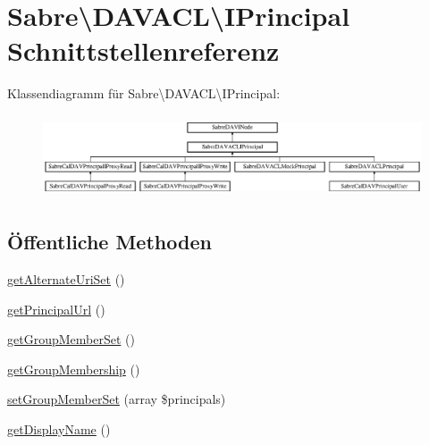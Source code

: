\hypertarget{interface_sabre_1_1_d_a_v_a_c_l_1_1_i_principal}{}\section{Sabre\textbackslash{}D\+A\+V\+A\+CL\textbackslash{}I\+Principal Schnittstellenreferenz}
\label{interface_sabre_1_1_d_a_v_a_c_l_1_1_i_principal}
Klassendiagramm für Sabre\textbackslash{}D\+A\+V\+A\+CL\textbackslash{}I\+Principal\+:\begin{figure}[H]
\begin{center}
\leavevmode
\includegraphics[height=2.466960cm]{interface_sabre_1_1_d_a_v_a_c_l_1_1_i_principal}
\end{center}
\end{figure}
\subsection*{Öffentliche Methoden}
\begin{DoxyCompactItemize}
\item 
\mbox{\hyperlink{interface_sabre_1_1_d_a_v_a_c_l_1_1_i_principal_ac28ebb97541a792d73dd4e15d3b8cdb6}{get\+Alternate\+Uri\+Set}} ()
\item 
\mbox{\hyperlink{interface_sabre_1_1_d_a_v_a_c_l_1_1_i_principal_ae3fc8f13f54eb5daba7416068c685298}{get\+Principal\+Url}} ()
\item 
\mbox{\hyperlink{interface_sabre_1_1_d_a_v_a_c_l_1_1_i_principal_ad9f9e4ed25ec5ec9325288b076cdd09f}{get\+Group\+Member\+Set}} ()
\item 
\mbox{\hyperlink{interface_sabre_1_1_d_a_v_a_c_l_1_1_i_principal_a8921b6c6ba5421dd0a6f6ba26def6fbd}{get\+Group\+Membership}} ()
\item 
\mbox{\hyperlink{interface_sabre_1_1_d_a_v_a_c_l_1_1_i_principal_a9dfeb1ed9f70016333ef2b0ec1753677}{set\+Group\+Member\+Set}} (array \$principals)
\item 
\mbox{\hyperlink{interface_sabre_1_1_d_a_v_a_c_l_1_1_i_principal_aff7f7f00c81458d5d9e20e28f4d32461}{get\+Display\+Name}} ()
\end{DoxyCompactItemize}



